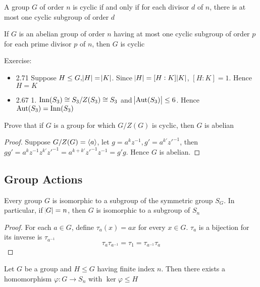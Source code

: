 \documentclass[11pt]{article}
\begin{document}
\begin{theorem}[]
\label{thm2.86}
A group \(G\) of order \(n\) is cyclic if and only if for each divisor \(d\) of
\(n\), there is at most one cyclic subgroup of order \(d\)
\end{theorem}

\begin{theorem}[]
If \(G\) is an abelian group of order \(n\) having at most one cyclic subgroup of
order \(p\) for each prime divisor \(p\) of \(n\), then \(G\) is cyclic
\end{theorem}

Exercise:
\begin{itemize}
\item 2.71 Suppose \(H\le G, \abs{H}=\abs{K}\). Since \(\abs{H}=[H:K]\abs{K}\),
\([H:K]=1\). Hence \(H=K\)
\item 2.67 1. \(\operatorname{Inn}(S_3)\cong S_3/Z(S_3)\cong S_3\) and \(\abs{\operatorname{Aut}(S_3)}\le 6\).
Hence \(\operatorname{Aut}(S_3)=\operatorname{Inn}(S_3)\)
\end{itemize}


\begin{exercise}
\label{ex2.69}
Prove that if \(G\) is a group for which \(G/Z(G)\) is cyclic, then \(G\) is abelian
\end{exercise}
\begin{proof}
Suppose \(G/Z(G)=\langle a\rangle\), let \(g=a^kz^{-1},g'=a^{k'}z'^{-1}\), then 
\(gg'=a^kz^{-1}z^{k'}z'^{-1}=a^{k+k'}z'^{-1}z^{-1}=g'g\). Hence \(G\) is abelian.
\end{proof}
\subsection{Group Actions}
\label{sec:org0ca0ded}
\begin{theorem}[Cayley]
Every group \(G\) is isomorphic to a subgroup of the symmetric group \(S_G\). In
particular, if \(\abs{G}=n\), then \(G\) is isomorphic to a subgroup of \(S_n\)
\end{theorem}

\begin{proof}
For each \(a\in G\), define \(\tau_a(x)=ax\) for every \(x\in G\). \(\tau_a\) is a
bijection for its inverse is \(\tau_{a^{-1}}\)
\begin{equation*}
\tau_a\tau_{a^{-1}}=\tau_1=\tau_{a^{-1}}\tau_a
\end{equation*}
\end{proof}

\begin{theorem}
Let \(G\) be a group and \(H\le G\) having finite index \(n\). Then there exists a
homomorphism \(\varphi:G\to S_n\) with \(\ker\varphi\le H\)
\end{theorem}
\end{document}
